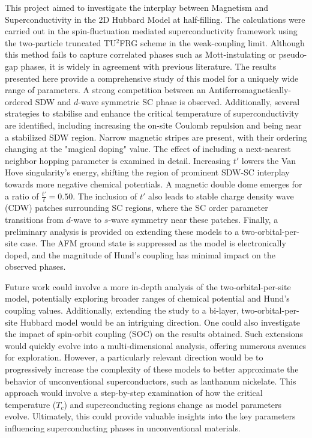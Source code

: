 \documentclass[12pt]{article}
\begin{document}
This project aimed to investigate the interplay between Magnetism and Superconductivity in the 2D Hubbard Model at half-filling. The calculations were carried out
in the spin-fluctuation mediated superconductivity framework using the two-particle truncated TU$^2$FRG scheme in the weak-coupling limit. Although this method
fails to capture correlated phases such as Mott-instulating or pseudo-gap phases, it is widely in agreement with previous literature. The results presented here provide
a comprehensive study of this model for a uniquely wide range of parameters. A strong competition between an
Antiferromagnetically-ordered SDW and $d$-wave symmetric SC phase is observed. 
Additionally, several strategies to stabilise and enhance the critical temperature of superconductivity are identified, including increasing the on-site Coulomb repulsion and being near a stabilized SDW region.
Narrow magnetic stripes are present, with their ordering changing at the "magical doping" value. The effect of including a next-nearest neighbor hopping parameter is examined in detail. Increasing $t'$ lowers the Van Hove singularity's energy, shifting the region of prominent SDW-SC interplay towards more negative chemical potentials.
A magnetic double dome emerges for a ratio of $\frac{t'}{t} = 0.50$.
The inclusion of $t'$ also leads to stable charge density wave (CDW) 
patches surrounding SC regions, where the SC order parameter transitions from $d$-wave to $s$-wave symmetry near these patches. 
Finally, a preliminary analysis is provided on extending these models to a 
two-orbital-per-site case. The AFM ground state is suppressed as the model is electronically doped, and the magnitude of Hund's 
coupling has minimal impact on the observed phases.\par


\medskip

\noindent Future work could involve a more in-depth analysis of the two-orbital-per-site model, potentially exploring broader ranges of 
chemical potential and Hund's coupling values. Additionally, extending the study to a bi-layer, two-orbital-per-site Hubbard model would be an intriguing direction. One could also investigate the 
impact of spin-orbit coupling (SOC) on the results obtained. Such extensions would quickly evolve into a multi-dimensional 
analysis, offering numerous avenues for exploration. However, a particularly relevant direction would be to progressively increase
the complexity of these models to better approximate the behavior of unconventional superconductors, 
such as lanthanum nickelate. This approach would involve a step-by-step examination of how the critical temperature ($T_c$) and superconducting 
regions change as model parameters evolve. Ultimately, this could provide valuable insights into the key parameters influencing superconducting 
phases in unconventional materials.
\end{document}
